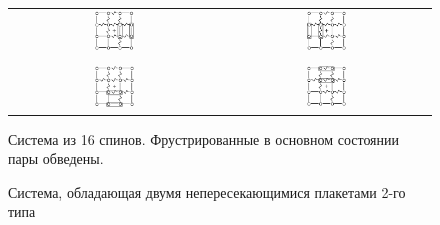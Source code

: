 \documentclass[utf8, babel, sor, jor, amsmath, amssymb, reprint]{elsarticle} %
\begin{document}
\begin{figure}[htbp]
	\centering
	\begin{tabular}{cc}
		\includegraphics[width=0.2\textwidth]{1_Cl1_Type_gs1.eps} & \hspace{0.03\textwidth}
		\includegraphics[width=0.2\textwidth]{1_Cl1_Type_gs2.eps} \\
		\vspace{0.5cm} \\
		\includegraphics[width=0.2\textwidth]{1_Cl1_Type_gs3.eps} & \hspace{0.03\textwidth}
		\includegraphics[width=0.2\textwidth]{1_Cl1_Type_gs4.eps} \\ 
	\end{tabular}
	\caption{Система из 16 спинов. Фрустрированные в основном состоянии пары обведены.}
	\label{fig:4x4.1}
\end{figure}

\begin{figure}[H]
	\centering
	\caption{Система, обладающая двумя непересекающимися плакетами 2-го типа}
	\label{fig:4x7}
\end{figure}
\end{document}
